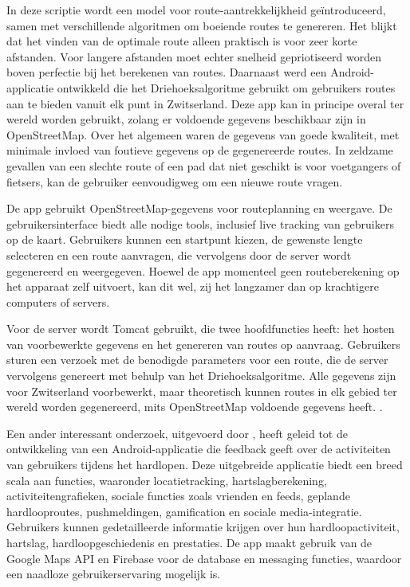      \break

    \textcite{Schulze2016} In deze scriptie wordt een model voor route-aantrekkelijkheid geïntroduceerd, 
    samen met verschillende algoritmen om boeiende routes te genereren. 
    Het blijkt dat het vinden van de optimale route alleen praktisch is voor zeer korte afstanden. 
    Voor langere afstanden moet echter snelheid gepriotiseerd worden boven perfectie bij het berekenen van routes. 
    Daarnaast werd een Android-applicatie ontwikkeld die het Driehoeksalgoritme gebruikt om gebruikers routes aan te bieden
    vanuit elk punt in Zwitserland. Deze app kan in principe overal ter wereld worden gebruikt, 
    zolang er voldoende gegevens beschikbaar zijn in OpenStreetMap. Over het algemeen waren de gegevens van goede kwaliteit, 
    met minimale invloed van foutieve gegevens op de gegenereerde routes. 
    In zeldzame gevallen van een slechte route of een pad dat niet geschikt is voor voetgangers of fietsers, 
    kan de gebruiker eenvoudigweg om een nieuwe route vragen.

 
    De app gebruikt OpenStreetMap-gegevens voor routeplanning en weergave. 
    De gebruikersinterface biedt alle nodige tools, inclusief live tracking van gebruikers op de kaart. 
    Gebruikers kunnen een startpunt kiezen, de gewenste lengte selecteren en een route aanvragen, 
    die vervolgens door de server wordt gegenereerd en weergegeven. Hoewel de app momenteel geen routeberekening op het apparaat zelf uitvoert, 
    kan dit wel, zij het langzamer dan op krachtigere computers of servers.

    
    Voor de server wordt Tomcat gebruikt, die twee hoofdfuncties heeft: 
    het hosten van voorbewerkte gegevens en het genereren van routes op aanvraag. 
    Gebruikers sturen een verzoek met de benodigde parameters voor een route, 
    die de server vervolgens genereert met behulp van het Driehoeksalgoritme. 
    Alle gegevens zijn voor Zwitserland voorbewerkt, maar theoretisch kunnen routes in elk gebied ter wereld worden gegenereerd, 
    mits OpenStreetMap voldoende gegevens heeft.
    \autocite{Schulze2016}.

    \break

    Een ander interessant onderzoek, uitgevoerd door \textcite{Adwinda2020}, 
    heeft geleid tot de ontwikkeling van een Android-applicatie die feedback geeft over de activiteiten van gebruikers tijdens het hardlopen. 
    Deze uitgebreide applicatie biedt een breed scala aan functies, waaronder locatietracking, hartslagberekening, activiteitengrafieken, sociale functies zoals vrienden en feeds, 
    geplande hardlooproutes, pushmeldingen, gamification en sociale media-integratie. Gebruikers kunnen gedetailleerde informatie krijgen over hun hardloopactiviteit, hartslag, 
    hardloopgeschiedenis en prestaties. De app maakt gebruik van de Google Maps API en Firebase voor de database en messaging functies, waardoor een naadloze gebruikerservaring mogelijk is.

